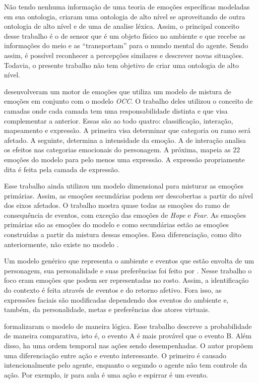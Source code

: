 Não tendo nenhuma informação de uma teoria de emoções específicas modeladas em
sua ontologia, \citet{wks2008towards} criaram uma ontologia de alto nível se
aproveitando de outra ontologia de alto nível e de uma de analise léxica.
Assim, o principal conceito desse trabalho é o de sensor que é um objeto
físico no ambiente e que recebe as informações do meio e as ``transportam''
para o mundo mental do agente. Sendo assim, é possível reconhecer a
percepções similares e descrever novas situações. Todavia, o presente trabalho
não tem objetivo de criar uma ontologia de alto nível\dev{}.

\citet{springerlink:10.1007/978-3-642-01639-448} desenvolveram um motor de
emoções que utiliza um modelo de mistura de emoções em conjunto com o modelo
\emph{OCC}. O trabalho deles utilizou o conceito de camadas onde cada camada tem uma
responsabilidade distinta e que visa complementar a anterior. Essas são ao todo
quatro: classificação, interação, mapeamento e expressão. A primeira visa
determinar que categoria ou ramo será afetado. A seguinte, determina a
intensidade da emoção. A de interação analisa os efeitos nas categorias
emocionais do personagem. A próxima, mapeia as 22 emoções do modelo para pelo
menos uma expressão. A expressão propriamente dita é feita pela camada de
expressão.

Esse trabalho ainda utilizou um modelo dimensional para misturar as emoções
primárias. Assim, as emoções secundárias podem ser descobertas a partir do
nível dos eixos afetados. O trabalho mostra quase todas as emoções do
ramo de consequência de eventos, com exceção das emoções de \emph{Hope} e
\emph{Fear}. As emoções primárias são as emoções do modelo \occ e como
secundárias estão as emoções construídas a partir da mistura dessas emoções.
Essa diferenciação, como dito anteriormente, não existe no modelo \occ.

Um modelo genérico que representa o ambiente e eventos que estão envolta de um
personagem, sua personalidade e suas preferências foi feito por
\citet{lera2009semantic}. Nesse trabalho o foco eram emoções que podem ser
representadas no rosto. Assim, a identificação do contexto é feita através de
eventos e do retorno afetivo. Fora isso, as expressões faciais são modificadas
dependendo dos eventos do ambiente e, também, da personalidade, metas e
preferências dos atores virtuais.

\citet{adam2009alfototoe} formalizaram o modelo \occ de maneira lógica.
Esse trabalho descreve a probabilidade de maneira comparativa, isto é, o
evento A é mais provável que o evento B. Além disso, ha uma ordem temporal nas
ações sendo desempenhadas. O autor propõem uma diferenciação entre ação e
evento interessante. O primeiro é causado intencionalmente pelo agente\dev{},
enquanto o segundo o agente não tem controle da ação. Por exemplo, ir para
aula é uma ação e espirrar é um evento.

